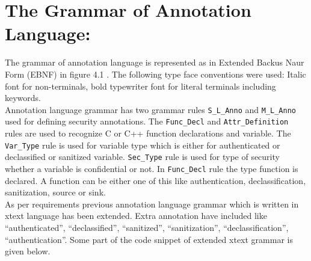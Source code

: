 \section{The Grammar of Annotation Language:}

The grammar of annotation language is represented as in Extended Backus Naur Form (EBNF) in figure 4.1 . The following type face conventions were used: Italic font for non-terminals, bold typewriter font for literal terminals including keywords.\\
 
Annotation language grammar has two grammar rules
\texttt{S\_L\_Anno} and \texttt{M\_L\_Anno} used for defining security annotations. The \texttt{Func\_Decl} and \texttt{Attr\_Definition} rules are used to recognize C or C++ function declarations and variable. The \texttt{Var\_Type} rule is used for variable type which is either for authenticated or declassified or sanitized variable. \texttt{Sec\_Type} rule is used for type of security whether a variable is confidential or not. In \texttt{Func\_Decl} rule the type function is declared. A function can be either one of this like authentication, declassification, sanitization, source or sink.\\

As per requirements previous annotation language grammar which is written in xtext language has been extended. Extra annotation have included like \enquote{authenticated}, \enquote{declassified}, \enquote{sanitized}, \enquote{sanitization}, \enquote{declassification}, \enquote{authentication}. Some part of the code snippet of extended xtext grammar is given below.

